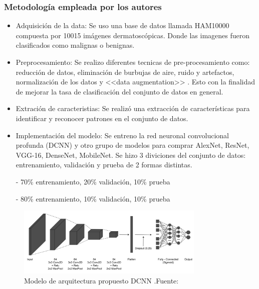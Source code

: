 \subsubsection{Metodología empleada por los autores}
\newcommand{\MEone}{ Adquisición de la data: Se uso una base de datos llamada HAM10000 compuesta por 10015 imágenes dermatoscópicas. Donde las imagenes fueron clasificados como malignas o benignas.
}
\newcommand{\MEtwo}{ Preprocesamiento: Se realizo diferentes tecnicas de pre-procesamiento como: reducción de datos, eliminación de burbujas de aire, ruido y artefactos, normalización de los datos y <<data augmentation>> . Esto con la finalidad de mejorar la tasa de clasificación del conjunto de datos en general. 
}

\newcommand{\MEthree}{ Extración de caracteristias: Se realizó una extracción de características para identificar y reconocer patrones en el conjunto de datos. 
}
\newcommand{\MEfour}{Implementación del modelo: Se entreno la red neuronal convolucional profunda (DCNN) y otro grupo de modelos para comprar AlexNet, ResNet, VGG-16, DenseNet, MobileNet.
Se hizo 3 diviciones del conjunto de datos: entrenamiento, validación y prueba de 2 formas distintas.

- 70\% entrenamiento, 20\% validación, 10\% prueba

- 80\% entrenamiento, 10\% validación, 10\% prueba
}



\begin{itemize}
	\item \MEone
	\item \MEtwo
	\item \MEthree
	\item \MEfour

\end{itemize}

\begin{figure}[h]
	\begin{center}
		\includegraphics[width=0.8\textwidth]{2/figuras/Problematica_An_enhanced_tecniques_imagen_02.png}
		\caption{Modelo de arquitectura propuesto DCNN .Fuente: \cite{ali_2021enhanced}}
		\label{1:fig}
	\end{center}
\end{figure}


